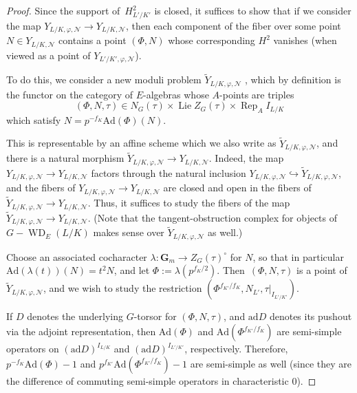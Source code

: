 \documentclass{amsart}
\renewcommand{\mathbb}{\mathbf}
\def\Ad{\mathrm{Ad}}
\DeclareMathOperator{\Lie}{Lie}
\def\ad{\mathrm{ad}}
\newcommand{\Rep}{\operatorname{Rep}}
\theoremstyle{definition}
\theoremstyle{remark}
\newcommand{\mar}[1]{}
\newcommand{\mar}[1]{\marginpar{\raggedright\tiny squirrel #1}}
\newcommand{\GG}{{\mathbb G}}
\DeclareMathOperator{\WD}{WD}
\newcommand{\Gm}{\GG_m}
\begin{document}
  \begin{proof}Since the support of~$H^2_{L'/K'}$ is closed, it
    suffices to show that if we consider the map
    $Y_{L/K,\varphi,\mathcal N}\rightarrow Y_{L/K,\mathcal N}$, then each component of
    the fiber over some point $N\in Y_{L/K,\mathcal N}$ contains a point
    $(\Phi,N)$ whose corresponding $H^2$ vanishes (when viewed as a
    point of $Y_{L'/K',\varphi,\mathcal N}$).%

  To do this, we consider a new moduli problem
  $\widetilde Y_{L/K,\varphi,\mathcal N}$ , which by definition is the functor on the category of
  $E$-algebras whose $A$-points are triples
  \[ (\Phi,N,\tau)\in N_G(\tau)\times \Lie Z_G(\tau)\times\Rep_A I_{L/K} \]
  which satisfy $N=p^{-f_K}\Ad(\Phi)(N)$.

  This is representable by an affine scheme which  we also write as
  $\widetilde Y_{L/K,\varphi,\mathcal N}$, and there is a natural morphism
  $\widetilde Y_{L/K,\varphi,\mathcal N}\rightarrow Y_{L/K,\mathcal N}$.  Indeed, the
  map $Y_{L/K,\varphi,\mathcal N}\rightarrow Y_{L/K,\mathcal N}$ factors through the
  natural inclusion
  $Y_{L/K,\varphi,\mathcal N}\hookrightarrow\widetilde Y_{L/K,\varphi,\mathcal N}$, and
  the fibers of $Y_{L/K,\varphi,\mathcal N}\rightarrow Y_{L/K,\mathcal N}$ are closed
  and open in the fibers of
  $\widetilde Y_{L/K,\varphi,\mathcal N}\rightarrow Y_{L/K,\mathcal N}$.  Thus, it
  suffices to study the fibers of the map
  $\widetilde Y_{L/K,\varphi,\mathcal N}\rightarrow Y_{L/K,\mathcal N}$. (Note that the
  tangent-obstruction complex for objects of $G-\WD_E(L/K)$ makes sense
  over $\widetilde Y_{L/K,\varphi,\mathcal N}$ as well.)

  Choose an associated cocharacter
  $\lambda:\Gm\rightarrow Z_G(\tau)^\circ$ for $N$, so that in
  particular $\Ad(\lambda(t))(N)=t^2N$, and let
  $\Phi:=\lambda(p^{f_K/2})$. Then~$(\Phi,N,\tau)$ is a point of
  $\widetilde Y_{L/K,\varphi,\mathcal N}$, and we wish to study the restriction
  $(\Phi^{f_{K'}/f_K}, N_{L'},\tau|_{I_{L'/K'}})$.

  If $D$ denotes the underlying $G$-torsor for $(\Phi, N,\tau)$, and
  $\ad D$ denotes its pushout via the adjoint representation, then
  $\Ad(\Phi)$ and $\Ad(\Phi^{f_{K'}/f_K})$ are semi-simple operators
  on $(\ad D)^{I_{L/K}}$ and $(\ad D)^{I_{L'/K'}}$, respectively.
  Therefore, $p^{-f_K}\Ad(\Phi)-1$ and
  $p^{f_{K'}}\Ad(\Phi^{f_{K'}/f_K})-1$ are semi-simple as well (since
  they are the difference of commuting semi-simple operators in characteristic $0$).


\end{proof}
\end{document}
